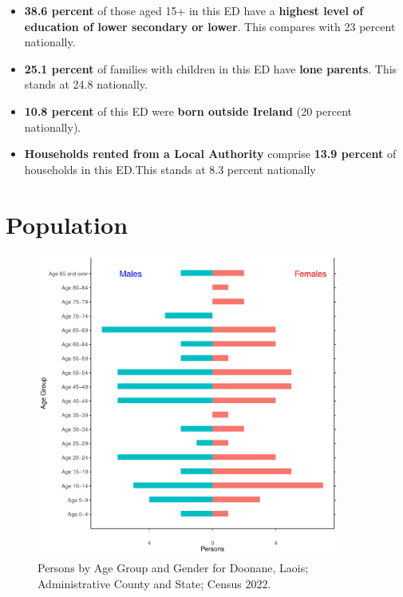 \documentclass{article}
\begin{document}
\begin{itemize}
\item \textbf{38.6 percent} of those aged 15+ in this ED have a \textbf{highest level of education of lower secondary or lower}. This compares with 23 percent nationally. 

\item \textbf{25.1 percent} of families with children in this ED have \textbf{lone parents}. This stands at 24.8 nationally.

\item \textbf{10.8 percent} of this ED were \textbf{born outside Ireland} (20 percent nationally).

\item \textbf{Households rented from a Local Authority} comprise \textbf{13.9 percent} of households in this ED.This stands at 8.3 percent nationally

\end{itemize}

\pagebreak

\section{Population} 
\label{sect:Pop}

\begin{figure}[h]
	\centering
	\includegraphics[width = 100mm]{../figures/PyramidPlot.pdf}
	\caption{Persons by Age Group and Gender for Doonane, Laois; Administrative County and State; Census 2022.}
	\label{fig:2ae19629-1a6a-13a3-e055-000000000001}
	\end{figure}
\end{document}
